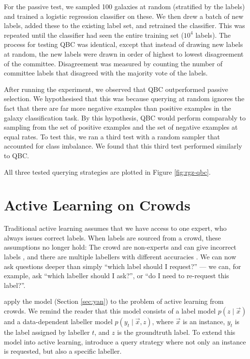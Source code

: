     For the passive test, we sampled 100 galaxies at random (stratified by the
    labels) and trained a logistic regression classifier on these. We then drew
    a batch of new labels, added these to the existing label set, and retrained
    the classifier. This was repeated until the classifier had seen the entire
    training set ($10^4$ labels). The process for testing QBC was identical,
    except that instead of drawing new labels at random, the new labels were
    drawn in order of highest to lowest disagreement of the committee.
    Disagreement was measured by counting the number of committee labels that
    disagreed with the majority vote of the labels.

    After running the experiment, we observed that QBC outperformed passive
    selection. We hypothesised that this was because querying at random ignores
    the fact that there are far more negative examples than positive examples in
    the galaxy classification task. By this hypothesis, QBC would perform
    comparably to sampling from the set of positive examples and the set of
    negative examples at equal rates. To test this, we ran a third test with a
    random sampler that accounted for class imbalance. We found that this third
    test performed similarly to QBC.

    All three tested querying strategies are plotted in Figure
    \ref{fig:rgz-qbc}.

\section{Active Learning on Crowds}
\label{sec:active-learning-on-crowds}
    
    Traditional active learning assumes that we have access to one expert, who
    always issues correct labels. When labels are sourced from a crowd, these
    assumptions no longer hold: The crowd are non-experts and can give incorrect
    labels \citep{mozafari12,yan11}, and there are multiple labellers with
    different accuracies \citep{yan11}. We can now ask questions deeper than
    simply ``which label should I request?'' --- we can, for example, ask
    ``which labeller should I ask?'', or ``do I need to re-request this
    label?''.

    \citet{yan11} apply the \citet{yan10} model (Section \ref{sec:yan}) to the
    problem of active learning from crowds. We remind the reader that this model
    consists of a label model $p(z \mid \vec x)$ and a data-dependent labeller
    model $p(y_t \mid \vec x, z)$, where $\vec x$ is an instance, $y_t$ is the
    label assigned by labeller $t$, and $z$ is the groundtruth label. To extend
    this model into active learning, \citeauthor{yan11} introduce a query
    strategy where not only an instance is requested, but also a specific
    labeller.

